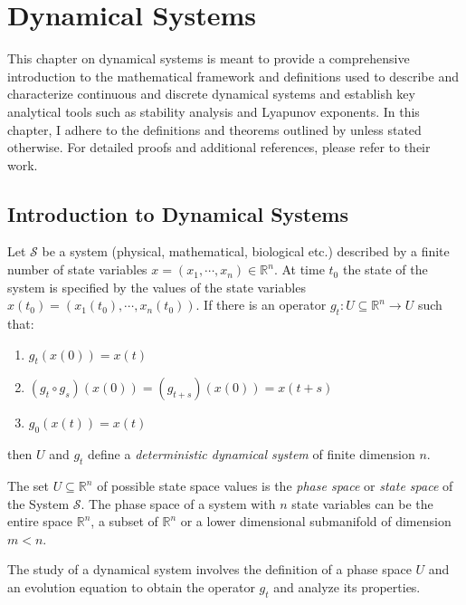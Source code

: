 \chapter{Dynamical Systems} 

This chapter on dynamical systems is meant to provide a comprehensive introduction to the mathematical framework and definitions used to 
describe and characterize continuous and discrete dynamical systems and establish key analytical tools such as stability analysis and 
Lyapunov exponents. In this chapter, I adhere to the definitions and theorems outlined by \cite{dilao2023dynamical} unless stated otherwise. 
For detailed proofs and additional references, please refer to their work.

\section{Introduction to Dynamical Systems}

\begin{definition}
    Let $\mathscr{S}$ be a system (physical, mathematical, biological etc.) described by a finite number of state variables $x = (x_1, \cdots, x_n) \in \mathbb{R}^n$.
    At time $t_0$ the state of the system is specified by the values of the state variables $x(t_0) = (x_1(t_0), \cdots, x_n(t_0))$.
    If there is an operator $g_t : U \subseteq \mathbb{R}^n \rightarrow U$ such that:

    \begin{enumerate}
        \item $g_t(x(0)) = x(t)$
        \item $(g_t \circ g_s)(x(0)) = (g_{t+s})(x(0)) = x(t + s)$
        \item $g_0(x(t)) = x(t)$
    \end{enumerate}
    then $U$ and $g_t$ define a \textit{deterministic dynamical system} of finite dimension $n$.
    \label{def:dyn_sys}
\end{definition}

The set $U \subseteq \mathbb{R}^n$ of possible state space values is the \textit{phase space} or \textit{state space} of the System $\mathscr{S}$. The phase space of a 
system with $n$ state variables can be the entire space $\mathbb{R}^n$, a subset of $\mathbb{R}^n$ or a lower dimensional submanifold of dimension $m < n$.

The study of a dynamical system involves the definition of a phase space $U$ and an evolution equation to obtain the operator $g_t$ and analyze its properties.

